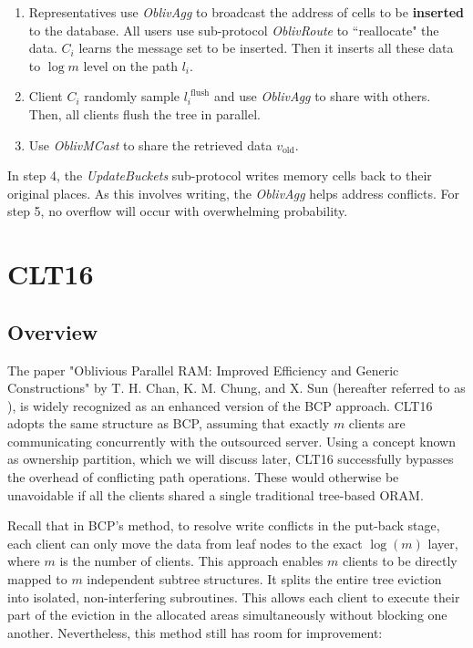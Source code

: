 \documentclass[fontsize=11pt]{article}
\begin{document}
\begin{center}
{\begin{minipage}{0.9\linewidth}
\begin{enumerate}
    \item Representatives use \textit{OblivAgg} to broadcast the address of cells to be \textbf{inserted} to the database. All users use sub-protocol \textit{OblivRoute} to ``reallocate" the data. $C_i$ learns the message set to be inserted. Then it inserts all these data to $\log m$ level on the path $l_i$.
    \item Client $C_i$ randomly sample $l_i^\text{ flush}$ and use \textit{OblivAgg} to share with others. Then, all clients flush the tree in parallel.
    \item Use \textit{OblivMCast} to share the retrieved data $v_\text{old}$.
 \end{enumerate}
\end{minipage}
}
\end{center}

In step 4, the \textit{UpdateBuckets} sub-protocol writes memory cells back to their original places. As this involves writing, the \textit{OblivAgg} helps address conflicts. For step 5, no overflow will occur with overwhelming probability.


\section{CLT16}
\subsection{Overview}
The paper "Oblivious Parallel RAM: Improved Efficiency and Generic Constructions" by T. H. Chan, K. M. Chung, and X. Sun (hereafter referred to as \cite{CLT16}), is widely recognized as an enhanced version of the BCP approach. CLT16 adopts the same structure as BCP, assuming that exactly $m$ clients are communicating concurrently with the outsourced server. Using a concept known as ownership partition, which we will discuss later, CLT16 successfully bypasses the overhead of conflicting path operations. These would otherwise be unavoidable if all the clients shared a single traditional tree-based ORAM.

Recall that in BCP's method, to resolve write conflicts in the put-back stage, each client can only move the data from leaf nodes to the exact $\log(m)$ layer, where $m$ is the number of clients. This approach enables $m$ clients to be directly mapped to $m$ independent subtree structures. It splits the entire tree eviction into isolated, non-interfering subroutines. This allows each client to execute their part of the eviction in the allocated areas simultaneously without blocking one another. Nevertheless, this method still has room for improvement:
\end{document}
